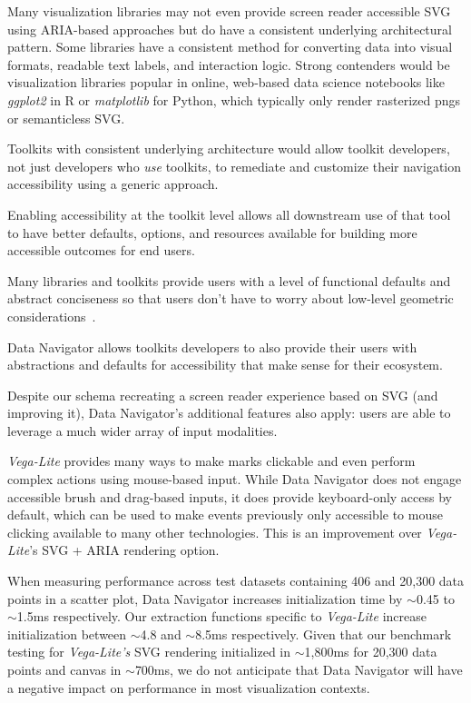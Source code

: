 \documentclass[journal]{vgtc}                %
\begin{document}
Many visualization libraries may not even provide screen reader accessible SVG using ARIA-based approaches but do have a consistent underlying architectural pattern. Some libraries have a consistent method for converting data into visual formats, readable text labels, and interaction logic. Strong contenders would be visualization libraries popular in online, web-based data science notebooks like \textit{ggplot2} in R or \textit{matplotlib} for Python, which typically only render rasterized pngs or semanticless SVG.

Toolkits with consistent underlying architecture would allow toolkit developers, not just developers who \textit{use} toolkits, to remediate and customize their navigation accessibility using a generic approach.

Enabling accessibility at the toolkit level allows all downstream use of that tool to have better defaults, options, and resources available for building more accessible outcomes for end users.

Many libraries and toolkits provide users with a level of functional defaults and abstract conciseness so that users don't have to worry about low-level geometric considerations~\cite{Satyanarayan2017VegaLite}.

Data Navigator allows toolkits developers to also provide their users with abstractions and defaults for accessibility that make sense for their ecosystem.

Despite our schema recreating a screen reader experience based on SVG (and improving it), Data Navigator's additional features also apply: users are able to leverage a much wider array of input modalities.

\textit{Vega-Lite} provides many ways to make marks clickable and even perform complex actions using mouse-based input. While Data Navigator does not engage accessible brush and drag-based inputs, it does provide keyboard-only access by default, which can be used to make events previously only accessible to mouse clicking available to many other technologies. This is an improvement over \textit{Vega-Lite}'s SVG + ARIA rendering option.

When measuring performance across test datasets containing 406 and 20,300 data points in a scatter plot, Data Navigator increases initialization time by $\sim$0.45 to $\sim$1.5ms respectively. Our extraction functions specific to \textit{Vega-Lite} increase initialization between $\sim$4.8 and $\sim$8.5ms respectively. Given that our benchmark testing for \textit{Vega-Lite's} SVG rendering initialized in $\sim$1,800ms for 20,300 data points and canvas in $\sim$700ms, we do not anticipate that Data Navigator will have a negative impact on performance in most visualization contexts.
\end{document}
